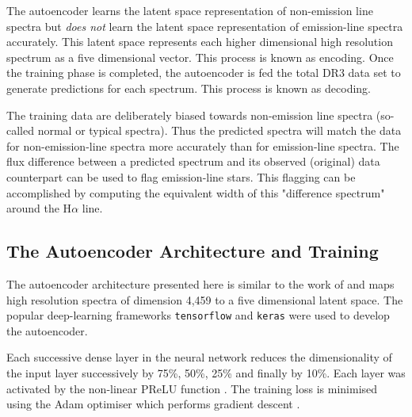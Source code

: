 The autoencoder learns the latent space representation of non-emission line spectra but \emph{does not} learn the latent space representation of emission-line spectra accurately. This latent space represents each higher dimensional high resolution spectrum as a five dimensional vector. This process is known as encoding. Once the training phase is completed, the autoencoder is fed the total DR3 data set to generate predictions for each spectrum. This process is known as decoding. 

The training data are deliberately biased towards non-emission line spectra (so-called normal or typical spectra). Thus the predicted spectra will match the data for non-emission-line spectra more accurately than for emission-line spectra. The flux difference between a predicted spectrum and its observed (original) data counterpart can be used to flag emission-line stars. This flagging can be accomplished by computing the equivalent width of this "difference spectrum" around the H$\alpha$ line.

\subsection{The Autoencoder Architecture and Training}

The autoencoder architecture presented here is similar to the work of \citet{vcotar2021galah} and maps high resolution spectra of dimension 4,459 to a five dimensional latent space. The popular deep-learning frameworks \texttt{tensorflow} \citep{tensorflow2015-whitepaper} and \texttt{keras} \citep{chollet2015keras} were used to develop the autoencoder.

Each successive dense layer in the neural network reduces the dimensionality of the input layer successively by 75\%, 50\%, 25\% and finally by 10\%. Each layer was activated by the non-linear PReLU function \citep{he2015delving}. The training loss is minimised using the Adam optimiser which performs gradient descent \citep{kingma2014adam}.

